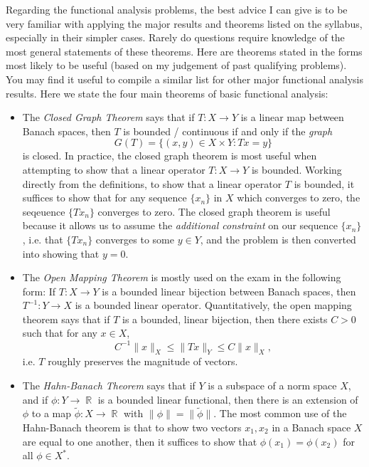 \documentclass[answers]{exam}
\DeclareMathOperator{\RR}{\mathbb{R}}
\begin{document}
\begin{questions}
Regarding the functional analysis problems, the best advice I can give is to be very familiar with applying the major results and theorems listed on the syllabus, especially in their simpler cases. Rarely do questions require knowledge of the most general statements of these theorems. Here are theorems stated in the forms most likely to be useful (based on my judgement of past qualifying problems). You may find it useful to compile a similar list for other major functional analysis results. Here we state the four main theorems of basic functional analysis:
%
\begin{itemize}
	\item The \emph{Closed Graph Theorem} says that if $T: X \to Y$ is a linear map between Banach spaces, then $T$ is bounded / continuous if and only if the \emph{graph}
	\[ G(T) = \{ (x,y) \in X \times Y: Tx = y \} \]
	is closed. In practice, the closed graph theorem is most useful when attempting to show that a linear operator $T: X \to Y$ is bounded. Working directly from the definitions, to show that a linear operator $T$ is bounded, it suffices to show that for any sequence $\{ x_n \}$ in $X$ which converges to zero, the seqeuence $\{ Tx_n \}$ converges to zero. The closed graph theorem is useful because it allows us to assume the \emph{additional constraint} on our sequence $\{ x_n \}$, i.e. that $\{ Tx_n \}$ converges to some $y \in Y$, and the problem is then converted into showing that $y = 0$.

	\item The \emph{Open Mapping Theorem} is mostly used on the exam in the following form: If $T: X \to Y$ is a bounded linear bijection between Banach spaces, then $T^{-1}: Y \to X$ is a bounded linear operator. Quantitatively, the open mapping theorem says that if $T$ is a bounded, linear bijection, then there exists $C > 0$ such that for any $x \in X$,
	\[ C^{-1} \| x \|_X \leq \| Tx \|_Y \leq C \| x \|_X, \]
	i.e. $T$ roughly preserves the magnitude of vectors.

	\item The \emph{Hahn-Banach Theorem} says that if $Y$ is a subspace of a norm space $X$, and if $\phi: Y \to \RR$ is a bounded linear functional, then there is an extension of $\phi$ to a map $\tilde{\phi}: X \to \RR$ with $\| \phi \| = \| \tilde{\phi} \|$. The most common use of the Hahn-Banach theorem is that to show two vectors $x_1,x_2$ in a Banach space $X$ are equal to one another, then it suffices to show that $\phi(x_1) = \phi(x_2)$ for all $\phi \in X^*$.


\end{itemize}
\end{questions}
\end{document}
